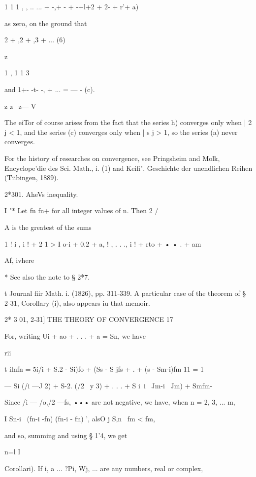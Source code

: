 1 1 1 , , .. ... + -,+ - + -+l+2 + 2- + r'+ a)

as zero, on the ground that

2 + ,2 + ,3 + ... (6)

\-z

1 , 1 1 3

and 1+- -t- -, + ... = — - (c).

z z~ z— V

The eiTor of course arises from the fact that the series h) converges
only when | 2 j < 1, and the series (c) converges only when | s j > 1,
so the series (a) never converges.

For the history of researches on convergence, see Pringsheim and Molk,
Encyclope'die des Sci. Math., i. (1) and Keifi", Geschichte der
unendlichen Reihen (Tiibingen, 1889).



2*301. AheVs inequality.

I "* Let fn fn+ for all integer values of n. Then 2 /

A is the greatest of the sums

1 ! i , i ! + 2 1 > I o-i + 0.2 + a, ! , . . ., i ! + rto + • • . + am



  Af, ivhere



* See also the note to § 2*7.

t Journal fiir Math. i. (1826), pp. 311-339. A particular case of the
theorem of § 2-31, Corollary (i), also appears iu that memoir.



2* 3 01, 2-31] THE THEORY OF CONVERGENCE 17

For, writing Ui + ao + . . . + a = Sn, we have

rii

t ilnfn = 5i/i + S.2 - Si)fo + (Ss - S jfs + . + (s - Sm-i)fm 11 = 1

— Si (/i —J 2) + S-2. (/2 ~y 3) + . . . + S i\ i \ Jm-i ~Jm) + Smfm-

Since /i — /o,/2 —fs, ••• are not negative, we have, when n = 2, 3,
... m,

I Sn-i \ (fn-i -fn) (fn-i - fn) ', alsO j S,n \ fm < fm,

and so, summing and using § 1'4, we get

n=l I

Corollari). If i, a ... ?Pi, Wj, ... are any numbers, real or complex,



